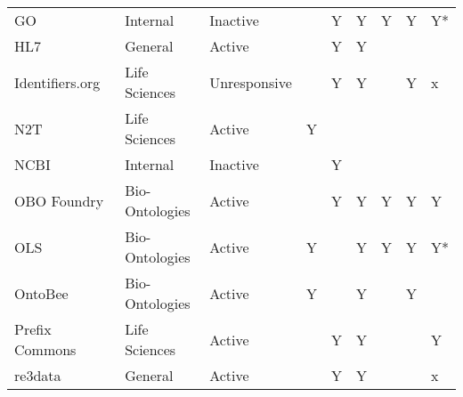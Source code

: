 \begin{table}
\begin{tabular}{lllllllll}
GO~\cite{TheGeneOntologyConsortium2019} &        Internal &     Inactive &                           &                      Y &                              Y &                      Y &                    Y &                     Y* \\
                  HL7~\cite{Bender2013} &         General &       Active &                           &                      Y &                              Y &                        &                      &                        \\
        Identifiers.org~\cite{Juty2012} &   Life Sciences & Unresponsive &                           &                      Y &                              Y &                        &                    Y &                      x \\
             N2T~\cite{Wimalaratne2018} &   Life Sciences &       Active &                         Y &                        &                                &                        &                      &                        \\
                  NCBI~\cite{Clark2016} &        Internal &     Inactive &                           &                      Y &                                &                        &                      &                        \\
         OBO Foundry~\cite{Jackson2021} &  Bio-Ontologies &       Active &                           &                      Y &                              Y &                      Y &                    Y &                      Y \\
                   OLS~\cite{Cote2006a} &  Bio-Ontologies &       Active &                         Y &                        &                              Y &                      Y &                    Y &                     Y* \\
                 OntoBee~\cite{Ong2017} &  Bio-Ontologies &       Active &                         Y &                        &                              Y &                        &                    Y &                        \\
    Prefix Commons~\cite{prefixcommons} &   Life Sciences &       Active &                           &                      Y &                              Y &                        &                      &                      Y \\
              re3data~\cite{Pampel2013} &         General &       Active &                           &                      Y &                              Y &                        &                      &                      x \\

\end{tabular}
\end{table}
